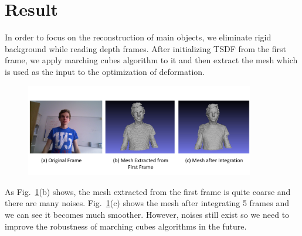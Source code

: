 \documentclass{article}
\begin{document}
\section{Result}
In order to focus on the reconstruction of main objects, we eliminate rigid background while reading depth frames. After initializing TSDF from the first frame, we apply marching cubes algorithm to it and then extract the mesh which is used as the input to the optimization of deformation. 
\begin{figure}[h]
\centering
\includegraphics[width=10cm]{figures/upperbody.png}
\caption{ }
\label{fig:uppperbody}
\end{figure}
As Fig.~\ref{fig:uppperbody}(b) shows, the mesh extracted from the first frame is quite coarse and there are many noises. Fig.~\ref{fig:uppperbody}(c) shows the mesh after integrating 5 frames and we can see it becomes much smoother. However, noises still exist so we need to improve the robustness of marching cubes algorithms in the future.  



\end{document}
